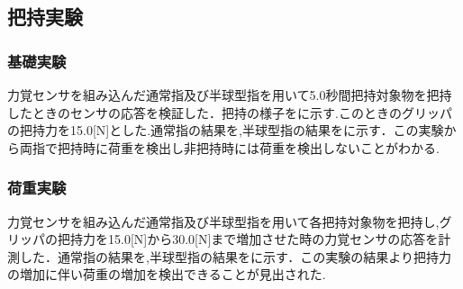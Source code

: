 \newpage

\subsection{把持実験}
\subsubsection{基礎実験}
力覚センサを組み込んだ通常指及び半球型指を用いて5.0秒間把持対象物を把持したときのセンサの応答を検証した．把持の様子をに示す.このときのグリッパの把持力を15.0[N]とした.通常指の結果を,半球型指の結果をに示す．この実験から両指で把持時に荷重を検出し非把持時には荷重を検出しないことがわかる.

\subsubsection{荷重実験}
力覚センサを組み込んだ通常指及び半球型指を用いて各把持対象物を把持し,グリッパの把持力を15.0[N]から30.0[N]まで増加させた時の力覚センサの応答を計測した．通常指の結果を,半球型指の結果をに示す．この実験の結果より把持力の増加に伴い荷重の増加を検出できることが見出された.

